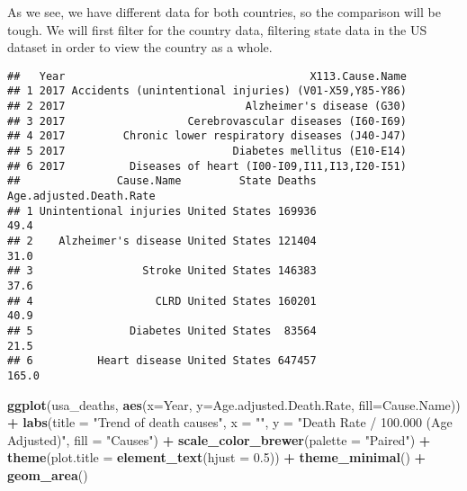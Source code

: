 \documentclass[]{article}
\newenvironment{Shaded}{\begin{snugshade}}{\end{snugshade}}
\newcommand{\DataTypeTok}[1]{\textcolor[rgb]{0.13,0.29,0.53}{#1}}
\newcommand{\FloatTok}[1]{\textcolor[rgb]{0.00,0.00,0.81}{#1}}
\newcommand{\KeywordTok}[1]{\textcolor[rgb]{0.13,0.29,0.53}{\textbf{#1}}}
\newcommand{\NormalTok}[1]{#1}
\newcommand{\OperatorTok}[1]{\textcolor[rgb]{0.81,0.36,0.00}{\textbf{#1}}}
\newcommand{\StringTok}[1]{\textcolor[rgb]{0.31,0.60,0.02}{#1}}
\begin{document}
As we see, we have different data for both countries, so the comparison
will be tough. We will first filter for the country data, filtering
state data in the US dataset in order to view the country as a whole.

\begin{Shaded}
\end{Shaded}

\begin{verbatim}
##   Year                                      X113.Cause.Name
## 1 2017 Accidents (unintentional injuries) (V01-X59,Y85-Y86)
## 2 2017                            Alzheimer's disease (G30)
## 3 2017                   Cerebrovascular diseases (I60-I69)
## 4 2017         Chronic lower respiratory diseases (J40-J47)
## 5 2017                          Diabetes mellitus (E10-E14)
## 6 2017          Diseases of heart (I00-I09,I11,I13,I20-I51)
##               Cause.Name         State Deaths Age.adjusted.Death.Rate
## 1 Unintentional injuries United States 169936                    49.4
## 2    Alzheimer's disease United States 121404                    31.0
## 3                 Stroke United States 146383                    37.6
## 4                   CLRD United States 160201                    40.9
## 5               Diabetes United States  83564                    21.5
## 6          Heart disease United States 647457                   165.0
\end{verbatim}

\begin{Shaded}
\begin{Highlighting}[]
\KeywordTok{ggplot}\NormalTok{(usa_deaths, }\KeywordTok{aes}\NormalTok{(}\DataTypeTok{x=}\NormalTok{Year, }\DataTypeTok{y=}\NormalTok{Age.adjusted.Death.Rate, }\DataTypeTok{fill=}\NormalTok{Cause.Name)) }\OperatorTok{+}\StringTok{ }
\StringTok{  }\KeywordTok{labs}\NormalTok{(}\DataTypeTok{title =} \StringTok{"Trend of death causes"}\NormalTok{, }\DataTypeTok{x =} \StringTok{""}\NormalTok{, }\DataTypeTok{y =} \StringTok{"Death Rate / 100.000 (Age Adjusted)"}\NormalTok{, }\DataTypeTok{fill =} \StringTok{"Causes"}\NormalTok{) }\OperatorTok{+}
\StringTok{  }\KeywordTok{scale_color_brewer}\NormalTok{(}\DataTypeTok{palette =} \StringTok{"Paired"}\NormalTok{) }\OperatorTok{+}
\StringTok{  }\KeywordTok{theme}\NormalTok{(}\DataTypeTok{plot.title =} \KeywordTok{element_text}\NormalTok{(}\DataTypeTok{hjust =} \FloatTok{0.5}\NormalTok{)) }\OperatorTok{+}
\StringTok{  }\KeywordTok{theme_minimal}\NormalTok{() }\OperatorTok{+}
\StringTok{  }\KeywordTok{geom_area}\NormalTok{()}
\end{Highlighting}
\end{Shaded}
\end{document}
